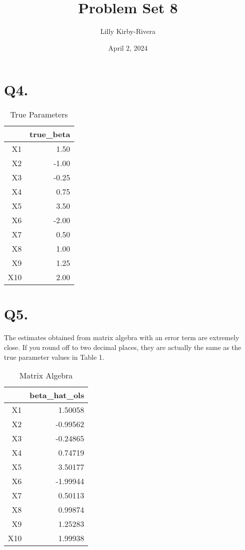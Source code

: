 \documentclass{article}
\title{Problem Set 8}
\author{Lilly Kirby-Rivera}
\date{April 2, 2024}
\begin{document}
\maketitle
\section*{Q4.}

\begin{table}[H]
\centering
\caption{True Parameters} 
\begin{tabular}{rr}
  \hline
 & true\_beta \\ 
  \hline
X1 & 1.50 \\ 
  X2 & -1.00 \\ 
  X3 & -0.25 \\ 
  X4 & 0.75 \\ 
  X5 & 3.50 \\ 
  X6 & -2.00 \\ 
  X7 & 0.50 \\ 
  X8 & 1.00 \\ 
  X9 & 1.25 \\ 
  X10 & 2.00 \\ 
   \hline
\end{tabular}
\end{table}

\section*{Q5.}

The estimates obtained from matrix algebra with an error term are extremely close. If you round off to two decimal places, they are actually the same as the true parameter values in Table 1.

\begin{table}[H]
\centering
\caption{Matrix Algebra} 
\begin{tabular}{rr}
  \hline
 & beta\_hat\_ols \\ 
  \hline
X1 & 1.50058 \\ 
  X2 & -0.99562 \\ 
  X3 & -0.24865 \\ 
  X4 & 0.74719 \\ 
  X5 & 3.50177 \\ 
  X6 & -1.99944 \\ 
  X7 & 0.50113 \\ 
  X8 & 0.99874 \\ 
  X9 & 1.25283 \\ 
  X10 & 1.99938 \\ 
   \hline
\end{tabular}
\end{table}
\end{document}
